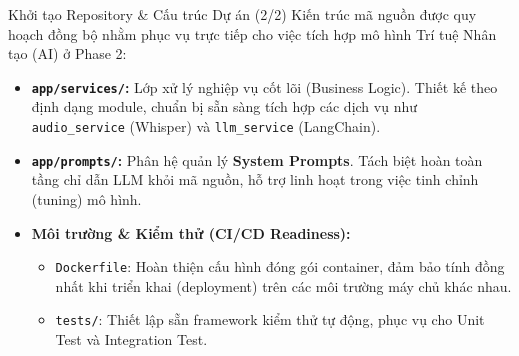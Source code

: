 \begin{frame}{Khởi tạo Repository \& Cấu trúc Dự án (2/2)}
    Kiến trúc mã nguồn được quy hoạch đồng bộ nhằm phục vụ trực tiếp cho việc tích hợp mô hình Trí tuệ Nhân tạo (AI) ở Phase 2:
    \vspace{0.2cm}
    \begin{itemize}
        \item \textbf{\texttt{app/services/}:} Lớp xử lý nghiệp vụ cốt lõi (Business Logic). Thiết kế theo định dạng module, chuẩn bị sẵn sàng tích hợp các dịch vụ như \texttt{audio\_service} (Whisper) và \texttt{llm\_service} (LangChain).
        \item \textbf{\texttt{app/prompts/}:} Phân hệ quản lý \textbf{System Prompts}. Tách biệt hoàn toàn tầng chỉ dẫn LLM khỏi mã nguồn, hỗ trợ linh hoạt trong việc tinh chỉnh (tuning) mô hình.
        \item \textbf{Môi trường \& Kiểm thử (CI/CD Readiness):} 
        \begin{itemize}
            \item \texttt{Dockerfile}: Hoàn thiện cấu hình đóng gói container, đảm bảo tính đồng nhất khi triển khai (deployment) trên các môi trường máy chủ khác nhau.
            \item \texttt{tests/}: Thiết lập sẵn framework kiểm thử tự động, phục vụ cho Unit Test và Integration Test.
        \end{itemize}
    \end{itemize}
\end{frame}

